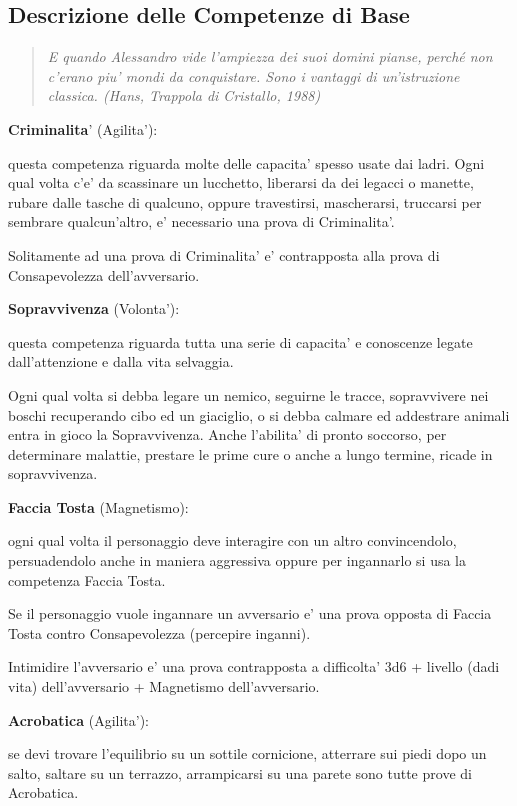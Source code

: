 \documentclass[a4paper,11pt,twoside,openany]{book}
\begin{document}
\subsection{Descrizione delle Competenze di Base}

\label{descrizione-delle-competenze-di-base}
\begin{quote}\textit{
E quando Alessandro vide l'ampiezza dei suoi domini pianse, perché non c'erano piu' mondi da conquistare. Sono i vantaggi di un'istruzione classica. (Hans, Trappola di Cristallo, 1988)
}\end{quote}

\textbf{Criminalita}' (Agilita'):

questa competenza riguarda molte delle capacita' spesso usate dai ladri. Ogni qual volta c'e' da scassinare un lucchetto, liberarsi da dei legacci o manette, rubare dalle tasche di qualcuno, oppure travestirsi, mascherarsi, truccarsi per sembrare qualcun'altro, e' necessario una prova di Criminalita'.

Solitamente ad una prova di Criminalita' e' contrapposta alla prova di Consapevolezza dell'avversario.

\textbf{Sopravvivenza} (Volonta'):

questa competenza riguarda tutta una serie di capacita' e conoscenze legate dall'attenzione e dalla vita selvaggia.

Ogni qual volta si debba legare un nemico, seguirne le tracce, sopravvivere nei boschi recuperando cibo ed un giaciglio, o si debba calmare ed addestrare animali entra in gioco la Sopravvivenza.
Anche l'abilita' di pronto soccorso, per determinare malattie, prestare le prime cure o anche a lungo termine, ricade in sopravvivenza.

\textbf{Faccia Tosta} (Magnetismo):

ogni qual volta il personaggio deve interagire con un altro convincendolo, persuadendolo anche in maniera aggressiva oppure per ingannarlo si usa la competenza Faccia Tosta.

Se il personaggio vuole ingannare un avversario e' una prova opposta di Faccia Tosta contro Consapevolezza (percepire inganni).

Intimidire l'avversario e' una prova contrapposta a difficolta' 3d6 + livello (dadi vita) dell'avversario + Magnetismo dell'avversario.

\textbf{Acrobatica} (Agilita'):

se devi trovare l'equilibrio su un sottile cornicione, atterrare sui piedi dopo un salto, saltare su un terrazzo, arrampicarsi su una parete sono tutte prove di Acrobatica.
\end{document}
